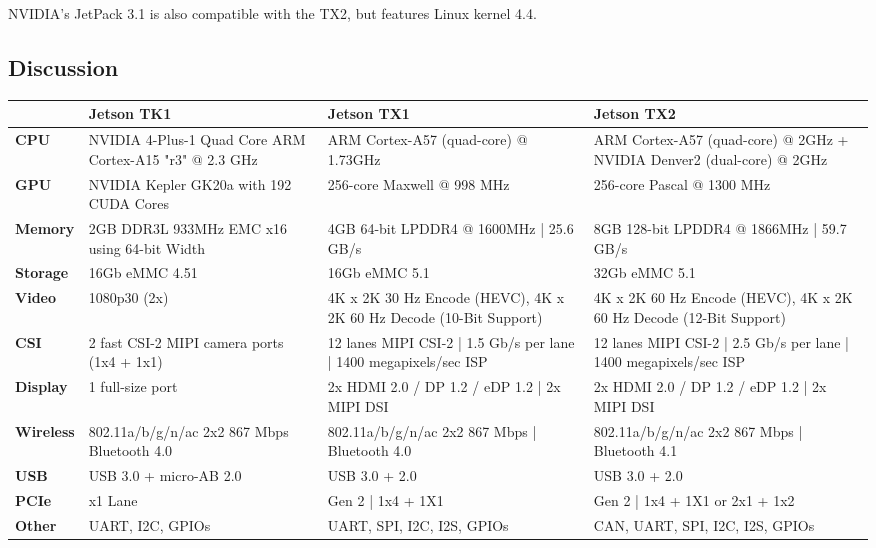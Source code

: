 NVIDIA's JetPack 3.1 is also compatible with the TX2, but features Linux kernel 
4.4\cite{TX2Wiki, JetPackRel}.\\

\subsection{Discussion}

\begin{tabular}{|l|p{5cm}|p{5cm}|p{5cm}|}
	\hline
	\textbf{} & \textbf{Jetson TK1} & \textbf{Jetson TX1} & \textbf{Jetson TX2}\\
	\hline
	\textbf{CPU} & NVIDIA 4-Plus-1 Quad Core ARM Cortex-A15 "r3" @ 2.3 GHz & ARM Cortex-A57 (quad-core) @ 1.73GHz & ARM Cortex-A57 (quad-core) @ 2GHz + NVIDIA Denver2 (dual-core) @ 2GHz\\
	\hline
	\textbf{GPU} & NVIDIA Kepler GK20a with 192 CUDA Cores & 256-core Maxwell @ 998 MHz & 256-core Pascal @ 1300 MHz\\
	\hline
	\textbf{Memory} & 2GB DDR3L 933MHz EMC x16 using 64-bit Width & 4GB 64-bit LPDDR4 @ 1600MHz | 25.6 GB/s & 8GB 128-bit LPDDR4 @ 1866MHz | 59.7 GB/s\\
	\hline
	\textbf{Storage} & 16Gb eMMC 4.51 & 16Gb eMMC 5.1 & 32Gb eMMC 5.1\\
	\hline
	\textbf{Video} & 1080p30 (2x) & 4K x 2K 30 Hz Encode (HEVC), 4K x 2K 60 Hz Decode (10-Bit Support) & 4K x 2K 60 Hz Encode (HEVC), 4K x 2K 60 Hz Decode (12-Bit Support)\\
	\hline
	\textbf{CSI} & 2 fast CSI-2 MIPI camera ports (1x4 + 1x1) & 12 lanes MIPI CSI-2 | 1.5 Gb/s per lane | 1400 megapixels/sec ISP & 12 lanes MIPI CSI-2 | 2.5 Gb/s per lane | 1400 megapixels/sec ISP\\
	\hline
	\textbf{Display} & 1 full-size port & 2x HDMI 2.0 / DP 1.2 / eDP 1.2 | 2x MIPI DSI & 2x HDMI 2.0 / DP 1.2 / eDP 1.2 | 2x MIPI DSI\\
	\hline
	\textbf{Wireless} & 802.11a/b/g/n/ac 2x2 867 Mbps Bluetooth 4.0 & 802.11a/b/g/n/ac 2x2 867 Mbps | Bluetooth 4.0 & 802.11a/b/g/n/ac 2x2 867 Mbps | Bluetooth 4.1\\
	\hline
	\textbf{USB} & USB 3.0 + micro-AB 2.0 & USB 3.0 + 2.0 & USB 3.0 + 2.0\\
	\hline
	\textbf{PCIe} & x1 Lane & Gen 2 | 1x4 + 1X1 & Gen 2 | 1x4 + 1X1 or 2x1 + 1x2\\
	\hline
	\textbf{Other} & UART, I2C, GPIOs & UART, SPI, I2C, I2S, GPIOs & CAN, UART, SPI, I2C, I2S, GPIOs\\
	\hline

\end{tabular}
